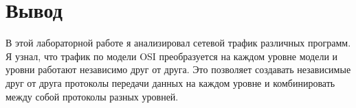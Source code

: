 \section{Вывод}
В этой лабораторной работе я анализировал сетевой трафик различных программ.
Я узнал, что трафик по модели OSI преобразуется на каждом уровне модели
и уровни работают независимо друг от друга.
Это позволяет создавать независимые друг от друга протоколы передачи данных на каждом уровне
и комбинировать между собой протоколы разных уровней.
